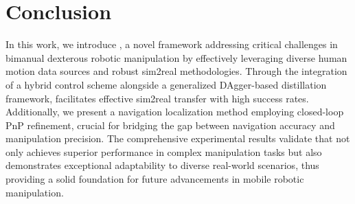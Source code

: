 \section{Conclusion}
In this work, we introduce \ourshort, a novel framework addressing critical challenges in bimanual dexterous robotic manipulation by effectively leveraging diverse human motion data sources and robust sim2real methodologies. Through the integration of a hybrid control scheme alongside a generalized DAgger-based distillation framework, \ourshort facilitates effective sim2real transfer with high success rates. Additionally, we present a navigation localization method employing closed-loop PnP refinement, crucial for bridging the gap between navigation accuracy and manipulation precision. The comprehensive experimental results validate that \ourshort not only achieves superior performance in complex manipulation tasks but also demonstrates exceptional adaptability to diverse real-world scenarios, thus providing a solid foundation for future advancements in mobile robotic manipulation.

